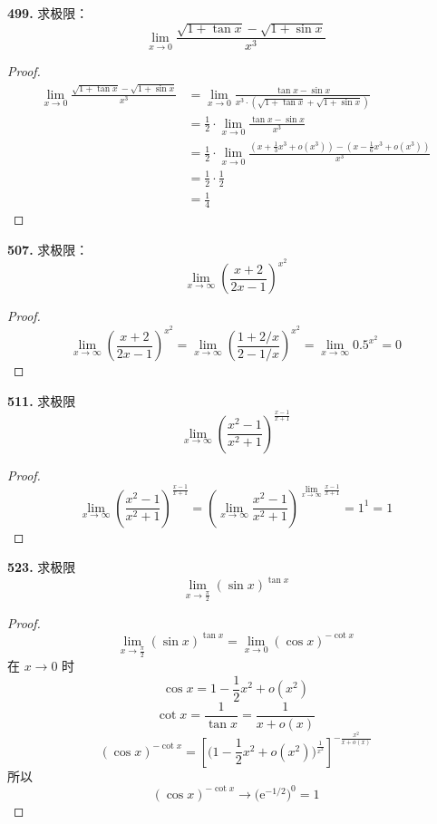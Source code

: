 \textbf{499.} 求极限：
\[\lim_{x \rightarrow 0} \frac{\sqrt{1 + \tan x} - \sqrt{1 + \sin x}}{x^3}\]
\begin{proof}
    \begin{align*}
        \lim_{x \rightarrow 0} \frac{\sqrt{1 + \tan x} - \sqrt{1 + \sin x}}{x^3} &= \lim_{x \rightarrow 0} \frac{\tan x - \sin x}{x^3 \cdot \left(\sqrt{1 + \tan x} + \sqrt{1 + \sin x}\right)}\\
        &= \frac{1}{2} \cdot \lim_{x \rightarrow 0} \frac{\tan x - \sin x}{x^3}\\
        &= \frac{1}{2} \cdot \lim_{x \rightarrow 0} \frac{(x + \frac{1}{3}x^3 + o(x^3)) - (x - \frac{1}{6}x^3 + o(x^3))}{x^3}\\
        &= \frac{1}{2} \cdot \frac{1}{2}\\
        &= \frac{1}{4}
    \end{align*}
\end{proof}\vspace{9pt}

\textbf{507.} 求极限：
\[\lim_{x \rightarrow \infty} \left(\frac{x + 2}{2x - 1}\right)^{x^2}\]
\begin{proof}
    \[\lim_{x \rightarrow \infty} \left(\frac{x + 2}{2x - 1}\right)^{x^2} = \lim_{x \rightarrow \infty} \left(\frac{1 + 2/x}{2 - 1/x}\right)^{x^2} = \lim_{x \rightarrow \infty} 0.5^{x^2} = 0\]
\end{proof}\vspace{9pt}

\textbf{511.} 求极限
\[\lim_{x \rightarrow \infty} \left(\frac{x^2 - 1}{x^2 + 1}\right)^{\frac{x-1}{x+1}}\]
\begin{proof}
    \[\lim_{x \rightarrow \infty} \left(\frac{x^2 - 1}{x^2 + 1}\right)^{\frac{x-1}{x+1}} = \left(\lim_{x \rightarrow \infty} \frac{x^2 - 1}{x^2 + 1}\right)^{\lim_{x \rightarrow \infty} \frac{x-1}{x+1}} = 1^1 = 1\]
\end{proof}\vspace{9pt}

\textbf{523.} 求极限
\[\lim_{x \rightarrow \frac{\pi}{2}} (\sin x)^{\tan x}\]
\begin{proof}
    \[\lim_{x \rightarrow \frac{\pi}{2}} (\sin x)^{\tan x} = \lim_{x \rightarrow 0} (\cos x)^{-\cot x}\]
    在 $x \rightarrow 0$ 时
    \[\cos x = 1 - \frac{1}{2}x^2 + o(x^2)\]
    \[\cot x = \frac{1}{\tan x} = \frac{1}{x + o(x)}\]
    \[(\cos x)^{-\cot x} = \left[\biggl(1 - \frac{1}{2}x^2 + o(x^2)\biggr)^{\frac{1}{x^2}}\right]^{-\frac{x^2}{x + o(x)}}\]
    所以
    \[(\cos x)^{-\cot x} \rightarrow \bigl(\mathrm{e}^{-1/2}\bigr)^0 = 1\]
\end{proof}\vspace{9pt}


